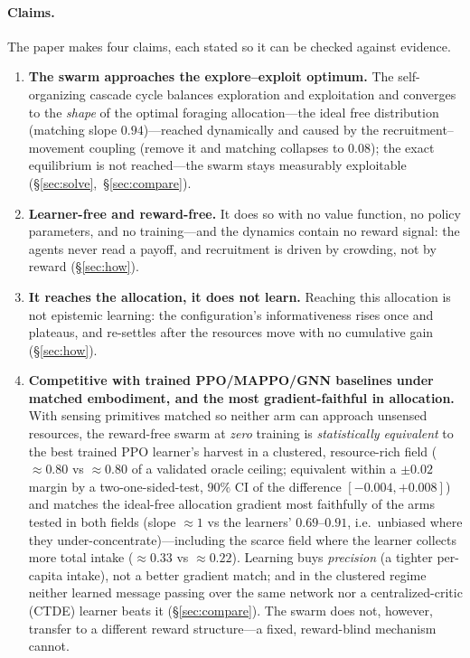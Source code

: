 \documentclass{article}
\begin{document}
\paragraph{Claims.} The paper makes four claims, each stated so it can be checked against evidence.
\begin{enumerate}\setlength\itemsep{2pt}
  \item \textbf{The swarm approaches the explore--exploit optimum.} The self-organizing cascade cycle
        balances exploration and exploitation and converges to the \emph{shape} of the optimal foraging
        allocation---the ideal free distribution (matching slope $0.94$)---reached dynamically and caused by the
        recruitment--movement coupling (remove it and matching collapses to $0.08$); the exact equilibrium is
        not reached---the swarm stays measurably exploitable (\S\ref{sec:solve},~\S\ref{sec:compare}).
  \item \textbf{Learner-free and reward-free.} It does so with no value function, no policy parameters, and
        no training---and the dynamics contain no reward signal: the agents never read a payoff, and
        recruitment is driven by crowding, not by reward (\S\ref{sec:how}).
  \item \textbf{It reaches the allocation, it does not learn.} Reaching this allocation is not epistemic
        learning: the configuration's informativeness rises once and plateaus, and re-settles after the
        resources move with no cumulative gain (\S\ref{sec:how}).
  \item \textbf{Competitive with trained PPO/MAPPO/GNN baselines under matched embodiment, and the most
        gradient-faithful in allocation.} With sensing primitives matched so neither arm can approach unsensed
        resources, the reward-free swarm at \emph{zero} training is \emph{statistically equivalent} to the best
        trained PPO learner's harvest in a clustered, resource-rich field (${\approx}0.80$ vs ${\approx}0.80$ of a
        validated oracle ceiling; equivalent within a $\pm0.02$ margin by a two-one-sided-test, $90\%$ CI of the
        difference $[-0.004,+0.008]$) and matches the ideal-free allocation gradient most faithfully of the arms
        tested in both fields (slope ${\approx}1$ vs the learners' $0.69$--$0.91$, i.e.\ unbiased where they
        under-concentrate)---including the scarce field where the learner collects more total intake
        (${\approx}0.33$ vs ${\approx}0.22$). Learning
        buys \emph{precision} (a tighter per-capita intake), not a better gradient match; and in the clustered
        regime neither learned message passing over the same network nor a centralized-critic (CTDE) learner
        beats it (\S\ref{sec:compare}). The swarm does not, however, transfer to a different reward structure---a fixed,
        reward-blind mechanism cannot.
\end{enumerate}
\end{document}
